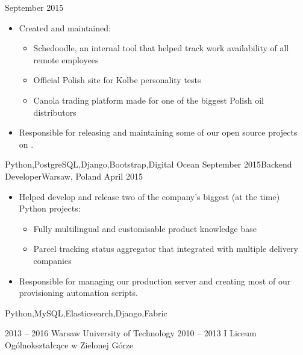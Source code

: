 \documentclass[localFont,alternative,10pt]{yaac-another-awesome-cv}
\begin{document}
\begin{experiences}
      {September 2015}{
                        \begin{itemize}
                          \item Created and maintained:
                            \begin{itemize}
                              \item Schedoodle, an internal tool that helped track work availability of all remote employees
                              \item Official Polish site for Kolbe personality tests
                              \item Canola trading platform made for one of the biggest Polish oil distributors
                            \end{itemize}
                          \item Responsible for releasing and maintaining some of our open source projects on .
                        \end{itemize}
                      }
                      {Python,PostgreSQL,Django,Bootstrap,Digital Ocean}
    \emptySeparator
    \experience
      {September 2015}{Backend Developer}{}{Warsaw, Poland}
      {April 2015}    {
                        \begin{itemize}
                          \item Helped develop and release two of the company's biggest (at the time) Python projects:
                            \begin{itemize}
                              \item Fully multilingual and customisable product knowledge base
                              \item Parcel tracking status aggregator that integrated with multiple delivery companies
                            \end{itemize}
                          \item Responsible for managing our production server and creating most of our provisioning automation scripts.
                        \end{itemize}
                      }
                      {Python,MySQL,Elasticsearch,Django,Fabric}
  \end{experiences}


  \begin{scholarship}
    \scholarshipentry
      {2013 – 2016}
      {Warsaw University of Technology}
    \scholarshipentry
      {2010 – 2013}
      {I Liceum Ogólnokształcące w Zielonej Górze}
  \end{scholarship}
\end{document}
